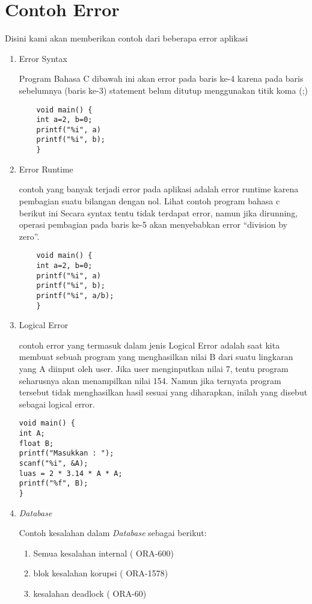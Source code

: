 \chapter{Contoh Error}

\par
Disini kami akan memberikan contoh dari beberapa error aplikasi 

\begin{enumerate}
\item Error Syntax 
\par
Program Bahasa C dibawah ini akan error pada baris ke-4 karena pada baris sebelumnya (baris ke-3) statement belum ditutup menggunakan titik koma (;)
\begin{verbatim}
	void main() {
	int a=2, b=0;
	printf("%i", a)
	printf("%i", b);
	}
\end{verbatim}
\item Error Runtime
\par 
contoh yang banyak terjadi error pada aplikasi adalah error runtime karena pembagian suatu bilangan dengan nol. Lihat contoh program bahasa c berikut ini Secara syntax tentu tidak terdapat error, namun jika dirunning, operasi pembagian pada baris ke-5 akan menyebabkan error “division by zero”.
\begin{verbatim}
	void main() {
	int a=2, b=0;
	printf("%i", a)
	printf("%i", b);
	printf("%i", a/b);
	}
\end{verbatim}
\item Logical Error
\par
contoh error yang termasuk dalam jenis Logical Error adalah saat kita membuat sebuah program yang menghasilkan nilai B dari suatu lingkaran yang A diinput oleh user. Jika user menginputkan nilai 7, tentu program seharusnya akan menampilkan nilai 154. Namun jika ternyata program tersebut tidak menghasilkan hasil sesuai yang diharapkan, inilah yang disebut sebagai logical error.
\begin{verbatim}
void main() {
int A;
float B;
printf("Masukkan : ");
scanf("%i", &A);
luas = 2 * 3.14 * A * A;
printf("%f", B);
}
\end{verbatim}
\item \textit{Database}
\par
Contoh kesalahan dalam \textit{Database} sebagai berikut:
\begin{enumerate}
\item Semua kesalahan internal ( ORA-600)
\item blok kesalahan korupsi ( ORA-1578)
\item kesalahan deadlock ( ORA-60) 

\end{enumerate}
\end{enumerate}
